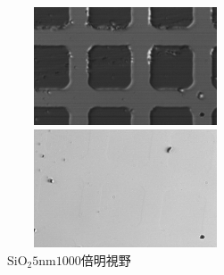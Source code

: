 \documentclass{jsarticle}
\begin{document}
\begin{figure}[htbp]
 \begin{minipage}{0.5\hsize}
  \begin{center}
   \includegraphics[width=70mm,height=35mm]{pictures/SiO2_100nm_x1000_DIC.bmp}
  \end{center}
  \caption{$\mathrm{SiO_2 100nm 1000倍　微分干渉観察}$}
  \label{fig:one}
 \end{minipage}
 \begin{minipage}{0.5\hsize}
  \begin{center}
   \includegraphics[width=70mm,height=35mm]{pictures/SiO2_5nm_x1000_BF.bmp}
  \end{center}
  \caption{$\mathrm{SiO_2 5nm 1000倍　明視野}$}
  \label{fig:two}
 \end{minipage}
\end{figure}
\end{document}
